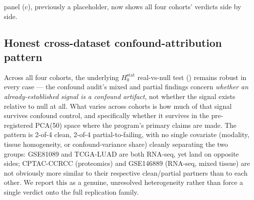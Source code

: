  panel (c), previously a placeholder, now shows all four cohorts' verdicts side by side.

\subsection{Honest cross-dataset confound-attribution pattern}

Across all four cohorts, the underlying $H_0^{\text{stat}}$ real-vs-null test ()
remains robust in every case --- the confound audit's mixed and partial findings concern \emph{whether an
already-established signal is a confound artifact}, not whether the signal exists relative to null at all.
What varies across cohorts is how much of that signal survives confound control, and specifically whether
it survives in the pre-registered PCA(50) space where the program's primary claims are made. The pattern is
2-of-4 clean, 2-of-4 partial-to-failing, with no single covariate (modality, tissue homogeneity, or
confound-variance share) cleanly separating the two groups: GSE81089 and TCGA-LUAD are both RNA-seq, yet
land on opposite sides; CPTAC-CCRCC (proteomics) and GSE146889 (RNA-seq, mixed tissue) are not obviously
more similar to their respective clean/partial partners than to each other. We report this as a genuine,
unresolved heterogeneity rather than force a single verdict onto the full replication family.
